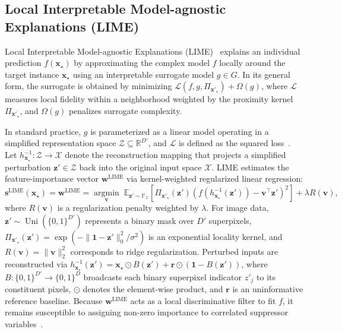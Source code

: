 \documentclass[pdflatex,sn-mathphys-num]{sn-jnl}
\theoremstyle{thmstyleone}
\theoremstyle{thmstyletwo}%
\theoremstyle{thmstylethree}%
\begin{document}
\subsection{Local Interpretable Model-agnostic Explanations (LIME)}
Local Interpretable Model-agnostic Explanations (LIME)~\cite{ribeiro2016} explains an individual prediction $f(\mathbf{x}_\star)$ by approximating the complex model $f$ locally around the target instance $\mathbf{x}_\star$ using an interpretable surrogate model $g \in G$. In its general form, the surrogate is obtained by minimizing $\mathcal{L}(f, g, \Pi_{\mathbf{x}'_\star}) + \Omega(g)$, where $\mathcal{L}$ measures local fidelity within a neighborhood weighted by the proximity kernel $\Pi_{\mathbf{x}'_\star}$, and $\Omega(g)$ penalizes surrogate complexity. 

In standard practice, $g$ is parameterized as a linear model operating in a simplified representation space $\mathcal{Z} \subseteq \mathbb{R}^{D'}$, and $\mathcal{L}$ is defined as the squared loss~\cite{tan2023}. Let $h_{\mathbf{x}_\star}^{-1}: \mathcal{Z} \to \mathcal{X}$ denote the reconstruction mapping that projects a simplified perturbation $\mathbf{z}' \in \mathcal{Z}$ back into the original input space $\mathcal{X}$. LIME estimates the feature-importance vector $\mathbf{w}^{\text{LIME}}$ via kernel-weighted regularized linear regression:
\begin{equation}
    \mathbf{s}^{\text{LIME}}(\mathbf{x}_\star) = \mathbf{w}^{\text{LIME}} = \operatorname*{argmin}_{\mathbf{v}} \; \mathbb{E}_{\mathbf{z}' \sim \mathbb{P}_{\mathcal{Z}}} \left[ \Pi_{\mathbf{x}'_\star}(\mathbf{z}') \left( f(h_{\mathbf{x}_\star}^{-1}(\mathbf{z}')) - \mathbf{v}^\top \mathbf{z}' \right)^2 \right] + \lambda R(\mathbf{v}),
\end{equation}
where $R(\mathbf{v})$ is a regularization penalty weighted by $\lambda$. For image data, $\mathbf{z}' \sim \operatorname{Uni}(\{0, 1\}^{D'})$ represents a binary mask over $D'$ superpixels, $\Pi_{\mathbf{x}'_\star}(\mathbf{z}') = \exp(-\|\mathbf{1} - \mathbf{z}'\|_0^2 / \sigma^2)$ is an exponential locality kernel, and $R(\mathbf{v}) = \|\mathbf{v}\|_2^2$ corresponds to ridge regularization. Perturbed inputs are reconstructed via $h_{\mathbf{x}_\star}^{-1}(\mathbf{z}') = \mathbf{x}_\star \odot B(\mathbf{z}') + \mathbf{r} \odot (\mathbf{1} - B(\mathbf{z}'))$, where $B: \{0, 1\}^{D'} \to \{0, 1\}^D$ broadcasts each binary superpixel indicator $z'_j$ to its constituent pixels, $\odot$ denotes the element-wise product, and $\mathbf{r}$ is an uninformative reference baseline. Because $\mathbf{w}^{\text{LIME}}$ acts as a local discriminative filter to fit $f$, it remains susceptible to assigning non-zero importance to correlated suppressor variables~\cite{wilming2022}.
\end{document}
